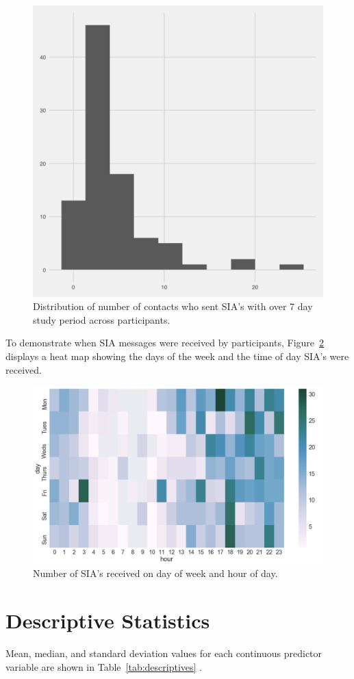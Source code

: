 \documentclass[12pt]{nuthesis}	%
\begin{document}
\begin{figure}[h]
\centering
\includegraphics[width=.7\textwidth]{figures/sia_messages_contacts_distribution}
\caption{Distribution of number of contacts who sent SIA's with over 7 day study period across participants.}
\label{fig:sia_num_contacts}
\end{figure}

To demonstrate when SIA messages were received by participants, Figure~\ref{fig:sia_heatmap} displays a heat map showing the days of the week and the time of day SIA's were received.

\begin{figure}[h]
\centering
\includegraphics[width=.7\textwidth]{figures/sia_heatmap}
\caption{Number of SIA's received on day of week and hour of day.}
\label{fig:sia_heatmap}
\end{figure}

\section{Descriptive Statistics}

Mean, median, and standard deviation values for each continuous predictor variable are shown in Table~\ref{tab:descriptives} .
\end{document}
